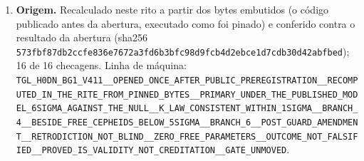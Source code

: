 \begin{center}
{{\begin{enumerate}
\item \textbf{Origem.} Recalculado neste rito a partir dos bytes embutidos (o código publicado antes da abertura, executado como foi pinado) e conferido contra o resultado da abertura (sha256 \texttt{573fbf87db2ccfe836e7672a3fd6b3bfc98d9fcb4d2ebce1d7cdb30d42abfbed}); 16 de 16 checagens. Linha de máquina: \texttt{TGL\_\allowbreak{}H0DN\_\allowbreak{}BG1\_\allowbreak{}V411\_\allowbreak{}\_\allowbreak{}OPENED\_\allowbreak{}ONCE\_\allowbreak{}AFTER\_\allowbreak{}PUBLIC\_\allowbreak{}PREREGISTRATION\_\allowbreak{}\_\allowbreak{}RECOMPUTED\_\allowbreak{}IN\_\allowbreak{}THE\_\allowbreak{}RITE\_\allowbreak{}FROM\_\allowbreak{}PINNED\_\allowbreak{}BYTES\_\allowbreak{}\_\allowbreak{}PRIMARY\_\allowbreak{}UNDER\_\allowbreak{}THE\_\allowbreak{}PUBLISHED\_\allowbreak{}MODEL\_\allowbreak{}6SIGMA\_\allowbreak{}AGAINST\_\allowbreak{}THE\_\allowbreak{}NULL\_\allowbreak{}\_\allowbreak{}K\_\allowbreak{}LAW\_\allowbreak{}CONSISTENT\_\allowbreak{}WITHIN\_\allowbreak{}1SIGMA\_\allowbreak{}\_\allowbreak{}BRANCH\_\allowbreak{}4\_\allowbreak{}\_\allowbreak{}BESIDE\_\allowbreak{}FREE\_\allowbreak{}CEPHEIDS\_\allowbreak{}BELOW\_\allowbreak{}5SIGMA\_\allowbreak{}\_\allowbreak{}BRANCH\_\allowbreak{}6\_\allowbreak{}\_\allowbreak{}POST\_\allowbreak{}GUARD\_\allowbreak{}AMENDMENT\_\allowbreak{}\_\allowbreak{}RETRODICTION\_\allowbreak{}NOT\_\allowbreak{}BLIND\_\allowbreak{}\_\allowbreak{}ZERO\_\allowbreak{}FREE\_\allowbreak{}PARAMETERS\_\allowbreak{}\_\allowbreak{}OUTCOME\_\allowbreak{}NOT\_\allowbreak{}FALSIFIED\_\allowbreak{}\_\allowbreak{}PROVED\_\allowbreak{}IS\_\allowbreak{}VALIDITY\_\allowbreak{}NOT\_\allowbreak{}CREDITATION\_\allowbreak{}\_\allowbreak{}GATE\_\allowbreak{}UNMOVED}.
\end{enumerate}
}}\end{center}\vspace{4pt}
